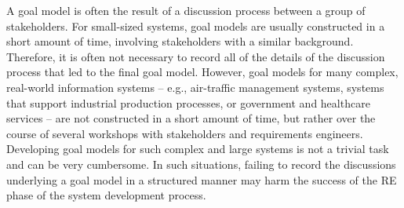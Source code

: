 


A goal model is often the result of a discussion process between a group of stakeholders. For small-sized systems, goal models are usually constructed in a short amount of time, involving stakeholders with a similar background. Therefore, it is often not necessary to record all of the details of the discussion process that led to the final goal model. However, goal models for many complex, real-world information systems -- e.g., air-traffic management systems, systems that support industrial production processes, or government and healthcare services -- are not constructed in a short amount of time, but rather over the course of several workshops with stakeholders and requirements engineers.
Developing goal models for such complex and large systems is not a trivial task and can be very cumbersome. In such situations, failing to record the discussions underlying a goal model in a structured manner may harm the success of the RE phase of the system development process. 


